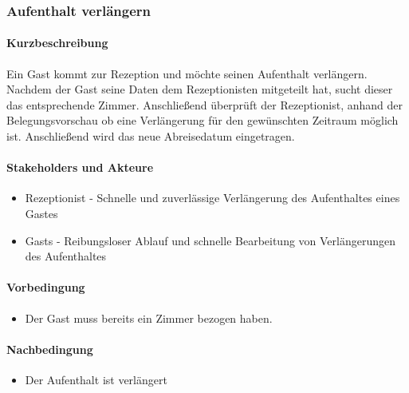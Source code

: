 \subsubsection{Aufenthalt verlängern}

\paragraph{Kurzbeschreibung}
Ein \Gls{Gast} kommt zur \Gls{Rezeption} und möchte seinen \Gls{Aufenthalt} verlängern. Nachdem der \Gls{Gast} seine Daten dem \Gls{Rezeptionist}en mitgeteilt hat, sucht dieser das entsprechende Zimmer. Anschließend überprüft der \Gls{Rezeptionist}, anhand der \Gls{Belegungsvorschau} ob eine Verlängerung für den gewünschten Zeitraum möglich ist. Anschließend wird das neue Abreisedatum eingetragen.

\paragraph{Stakeholders und Akteure}
\begin{itemize}
\item \Gls{Rezeptionist} - Schnelle und zuverlässige Verlängerung des \Gls{Aufenthalt}es eines \Gls{Gast}es
\item \Glspl{Gast} - Reibungsloser Ablauf und schnelle Bearbeitung von Verlängerungen des \Gls{Aufenthalt}es
\end{itemize}

\paragraph{Vorbedingung}
\begin{itemize}
\item Der \Gls{Gast} muss bereits ein \Gls{Zimmer} bezogen haben.
\end{itemize}

\paragraph{Nachbedingung}
\begin{itemize}
	\item Der \Gls{Aufenthalt} ist verlängert
\end{itemize}


